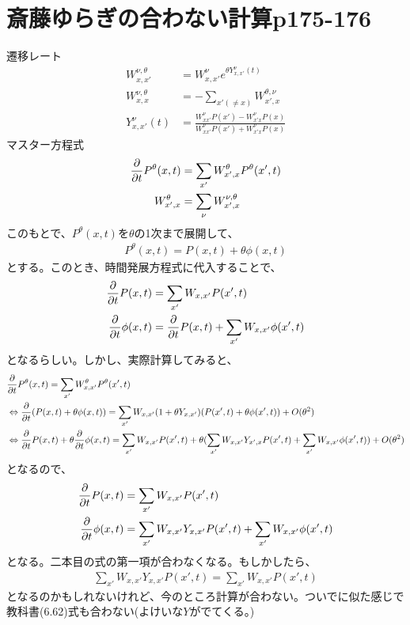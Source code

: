 \documentclass[a4paper,11pt]{jsarticle}
\numberwithin{equation}{section}
\begin{document}
\section{斎藤ゆらぎの合わない計算p175-176}
遷移レート
\begin{align}
  W_{x,x'}^{\nu,\theta}&= W_{x,x'}^{\nu}e^{\theta Y_{x,x'}^{\nu}(t)}\\
  W_{x,x}^{\nu,\theta} &= -\sum_{x'(\neq x)}W_{x',x}^{\theta,\nu} \\
  Y_{x,x'}^{\nu}(t) &=  \frac{W^{\nu}_{xx'}P(x')-W^{\nu}_{x'x}P(x)}{W^{\nu}_{xx'}P(x')+W^{\nu}_{x'x}P(x)}
\end{align}
マスター方程式
\begin{align}
  \pdv{t}P^{\theta}(x,t) &= \sum_{x'}W_{x',x}^{\theta}P^{\theta}(x',t)\\
  W_{x',x}^{\theta} &= \sum_{\nu}W_{x',x}^{\nu,\theta}
\end{align}
このもとで、$P^{\theta}(x,t)$を$\theta$の1次まで展開して、
\begin{align}
  P^{\theta}(x,t) = P(x,t) + \theta\phi(x,t)
\end{align}
とする。このとき、時間発展方程式に代入することで、
\begin{align}
  \pdv{t}P(x,t) &= \sum_{x'}W_{x,x'}P(x',t)\\
  \pdv{t}\phi(x,t) &= \pdv{t}P(x,t) +\sum_{x'}W_{x,x'}\phi(x',t)
\end{align}
となるらしい。しかし、実際計算してみると、
\begin{align}
  &\pdv{t}P^{\theta}(x,t) = \sum_{x'}W_{x,x'}^{\theta}P^{\theta}(x',t)\\
  &\Leftrightarrow \pdv{t}(P(x,t) + \theta\phi(x,t)) = \sum_{x'}W_{x,x'}(1+\theta Y_{x,x'})(P(x',t) + \theta\phi(x',t)) +O(\theta^2)\\
  &\Leftrightarrow \pdv{t}P(x,t) + \theta\pdv{t}\phi(x,t) = \sum_{x'}W_{x,x'}P(x',t) + \theta(\sum_{x'}W_{x,x'}Y_{x',x}P(x',t) + \sum_{x'}W_{x,x'}\phi(x',t)) + O(\theta^2)
\end{align}
となるので、
\begin{align}
  \pdv{t}P(x,t) &= \sum_{x'}W_{x,x'}P(x',t)\\
  \pdv{t}\phi(x,t) &=\sum_{x'}W_{x,x'}Y_{x,x'}P(x',t) + \sum_{x'}W_{x,x'}\phi(x',t)
\end{align}
となる。二本目の式の第一項が合わなくなる。もしかしたら、
\begin{align}
  \sum_{x'}W_{x,x'}Y_{x,x'}P(x',t) = \sum_{x'}W_{x,x'}P(x',t)
\end{align}
となるのかもしれないけれど、今のところ計算が合わない。ついでに似た感じで教科書(6.62)式も合わない(よけいな$Y$がでてくる。)
\end{document}
